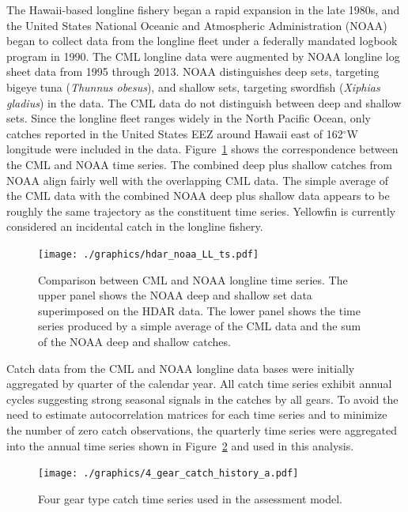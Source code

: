 \documentclass[12pt,letterpaper]{article}
\renewcommand\deg[1]{$^\circ$#1}
\begin{document}
The Hawaii-based longline fishery began a rapid expansion in the late
1980s, and the United States National Oceanic and Atmospheric Administration (NOAA)
began to collect data from the longline fleet under a
federally mandated logbook program in 1990. The CML longline data were
augmented by NOAA longline log sheet data from 1995 through 2013.
NOAA distinguishes deep sets, targeting bigeye tuna ({\it Thunnus
obesus}), and shallow sets,
targeting swordfish ({\it Xiphias gladius}) in the data. 
The CML data do not distinguish between deep and shallow sets.
Since the longline fleet ranges widely in the North Pacific Ocean,
only catches reported in the United States EEZ around Hawaii east of
162\deg{W} longitude were included in the data.
Figure~\ref{fig:hdarnoaaLLTS} shows the correspondence between the
CML and NOAA time series. The combined deep plus shallow catches from
NOAA align fairly well with the overlapping CML data. The simple
average of the CML data with the combined NOAA deep plus shallow data
appears to be roughly the same trajectory as the
constituent time series. Yellowfin is currently considered an incidental catch
in the longline fishery.

\begin{figure}
\begin{center}
\texttt{[image: ./graphics/hdar\_noaa\_LL\_ts.pdf]}
\caption{\label{fig:hdarnoaaLLTS}
Comparison between CML and NOAA longline time series. The upper panel
shows the NOAA deep and shallow set data superimposed on the HDAR
data. The lower panel shows the time series produced by a simple
average of the CML data and the sum of the NOAA deep and shallow
catches.}
\end{center}
\end{figure}

Catch data from the CML and NOAA longline data bases were initially
aggregated by quarter of the calendar year.
All catch time series exhibit annual cycles suggesting strong seasonal
signals in the catches by all gears. To avoid the need to estimate
autocorrelation matrices for each time series and to minimize the
number of zero catch observations, the quarterly time series were
aggregated into the annual time series shown in Figure~\ref{fig:data}
and used in this analysis.

\begin{figure}
\begin{center}
\texttt{[image: ./graphics/4\_gear\_catch\_history\_a.pdf]}
\caption{\label{fig:data}
Four gear type catch time series used in the assessment model.
}
\end{center}
\end{figure}
\end{document}
